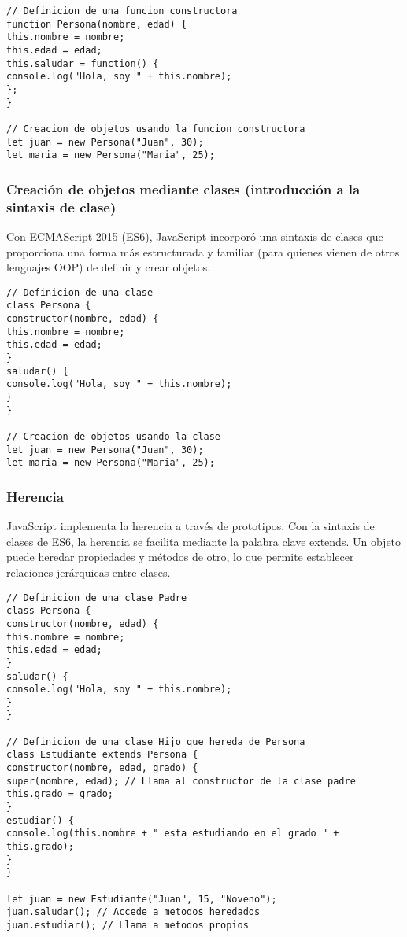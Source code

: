\documentclass[executivepaper]{article}
\begin{document}
\begin{lstlisting}
// Definicion de una funcion constructora
function Persona(nombre, edad) {
this.nombre = nombre;
this.edad = edad;
this.saludar = function() {
console.log("Hola, soy " + this.nombre);
};
}

// Creacion de objetos usando la funcion constructora
let juan = new Persona("Juan", 30);
let maria = new Persona("Maria", 25);
\end{lstlisting}

\subsubsection*{Creación de objetos mediante clases (introducción a la sintaxis de clase)}
Con ECMAScript 2015 (ES6), JavaScript incorporó una sintaxis de clases que proporciona una forma más estructurada y familiar (para quienes vienen de otros lenguajes OOP) de definir y crear objetos.

\begin{lstlisting}
// Definicion de una clase
class Persona {
constructor(nombre, edad) {
this.nombre = nombre;
this.edad = edad;
}
saludar() {
console.log("Hola, soy " + this.nombre);
}
}

// Creacion de objetos usando la clase
let juan = new Persona("Juan", 30);
let maria = new Persona("Maria", 25);
\end{lstlisting}

\subsubsection*{Herencia}
JavaScript implementa la herencia a través de prototipos. Con la sintaxis de clases de ES6, la herencia se facilita mediante la palabra clave extends. Un objeto puede heredar propiedades y métodos de otro, lo que permite establecer relaciones jerárquicas entre clases.

\begin{lstlisting}
// Definicion de una clase Padre
class Persona {
constructor(nombre, edad) {
this.nombre = nombre;
this.edad = edad;
}
saludar() {
console.log("Hola, soy " + this.nombre);
}
}

// Definicion de una clase Hijo que hereda de Persona
class Estudiante extends Persona {
constructor(nombre, edad, grado) {
super(nombre, edad); // Llama al constructor de la clase padre
this.grado = grado;
}
estudiar() {
console.log(this.nombre + " esta estudiando en el grado " + this.grado);
}
}

let juan = new Estudiante("Juan", 15, "Noveno");
juan.saludar(); // Accede a metodos heredados
juan.estudiar(); // Llama a metodos propios
\end{lstlisting}
\end{document}
